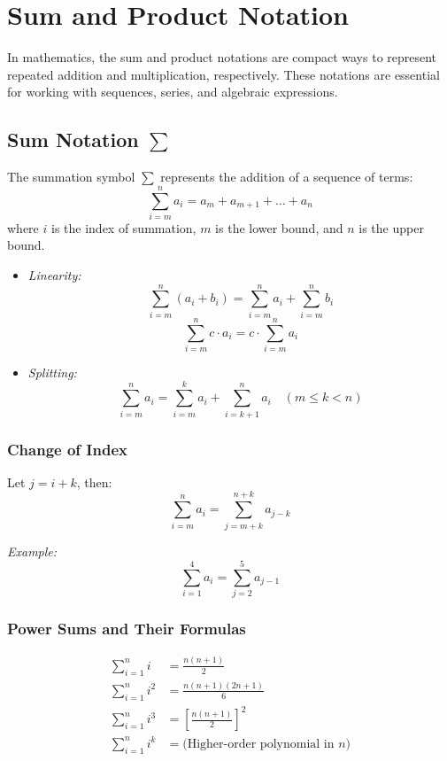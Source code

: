 \newpage
\section{Sum and Product Notation}

In mathematics, the sum and product notations are compact ways to represent repeated addition and multiplication, respectively. These notations are essential for working with sequences, series, and algebraic expressions.

\subsection{Sum Notation \texorpdfstring{\(\sum\)}{∑}}

The summation symbol \(\sum\) represents the addition of a sequence of terms:
\[
\sum_{i = m}^{n} a_i = a_m + a_{m+1} + \dots + a_n
\]
where \(i\) is the index of summation, \(m\) is the lower bound, and \(n\) is the upper bound.

\begin{itemize}[label=\(-\)]
    \item \emph{Linearity:}
    \[
    \sum_{i = m}^{n} (a_i + b_i) = \sum_{i = m}^{n} a_i + \sum_{i = m}^{n} b_i
    \]
    \[
    \sum_{i = m}^{n} c \cdot a_i = c \cdot \sum_{i = m}^{n} a_i
    \]
    \item \emph{Splitting:}
    \[
    \sum_{i = m}^{n} a_i = \sum_{i = m}^{k} a_i + \sum_{i = k+1}^{n} a_i \quad (m \le k < n)
    \]
\end{itemize}

\subsubsection{Change of Index}

Let \(j = i + k\), then:
\[
\sum_{i = m}^{n} a_i = \sum_{j = m + k}^{n + k} a_{j - k}
\]

\textit{Example:}
\[
\sum_{i = 1}^{4} a_i = \sum_{j = 2}^{5} a_{j - 1}
\]

\subsubsection{Power Sums and Their Formulas}

\begin{align*}
\sum_{i = 1}^{n} i &= \frac{n(n+1)}{2} \\
\sum_{i = 1}^{n} i^2 &= \frac{n(n+1)(2n+1)}{6} \\
\sum_{i = 1}^{n} i^3 &= \left[\frac{n(n+1)}{2}\right]^2 \\
\sum_{i = 1}^{n} i^k &= \text{(Higher-order polynomial in \(n\))}
\end{align*}

